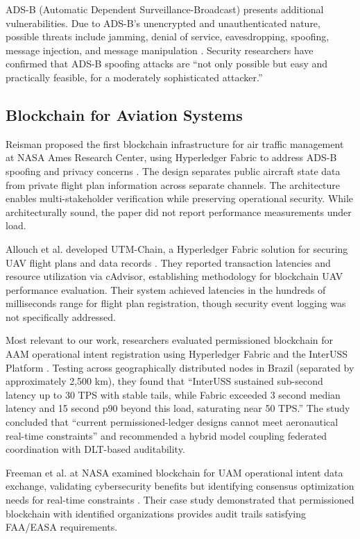 \documentclass[conference]{IEEEtran}
\begin{document}
ADS-B (Automatic Dependent Surveillance-Broadcast) presents additional vulnerabilities. Due to ADS-B's unencrypted and unauthenticated nature, possible threats include jamming, denial of service, eavesdropping, spoofing, message injection, and message manipulation \cite{reisman2019}. Security researchers have confirmed that ADS-B spoofing attacks are ``not only possible but easy and practically feasible, for a moderately sophisticated attacker.''

\subsection{Blockchain for Aviation Systems}

Reisman proposed the first blockchain infrastructure for air traffic management at NASA Ames Research Center, using Hyperledger Fabric to address ADS-B spoofing and privacy concerns \cite{reisman2019}. The design separates public aircraft state data from private flight plan information across separate channels. The architecture enables multi-stakeholder verification while preserving operational security. While architecturally sound, the paper did not report performance measurements under load.

Allouch et al. developed UTM-Chain, a Hyperledger Fabric solution for securing UAV flight plans and data records \cite{allouch2021}. They reported transaction latencies and resource utilization via cAdvisor, establishing methodology for blockchain UAV performance evaluation. Their system achieved latencies in the hundreds of milliseconds range for flight plan registration, though security event logging was not specifically addressed.

Most relevant to our work, researchers evaluated permissioned blockchain for AAM operational intent registration using Hyperledger Fabric and the InterUSS Platform \cite{permissioned2024}. Testing across geographically distributed nodes in Brazil (separated by approximately 2,500 km), they found that ``InterUSS sustained sub-second latency up to 30 TPS with stable tails, while Fabric exceeded 3 second median latency and 15 second p90 beyond this load, saturating near 50 TPS.'' The study concluded that ``current permissioned-ledger designs cannot meet aeronautical real-time constraints'' and recommended a hybrid model coupling federated coordination with DLT-based auditability.

Freeman et al. at NASA examined blockchain for UAM operational intent data exchange, validating cybersecurity benefits but identifying consensus optimization needs for real-time constraints \cite{freeman2023}. Their case study demonstrated that permissioned blockchain with identified organizations provides audit trails satisfying FAA/EASA requirements.
\end{document}
